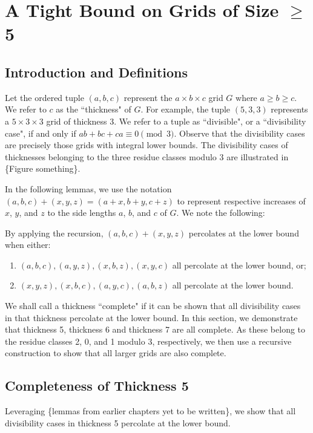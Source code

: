 \chapter{A Tight Bound on Grids of Size $\geq$ 5}

\section{Introduction and Definitions}
Let the ordered tuple $(a,b,c)$ represent the $a \times b \times c$ grid $G$ where $a \geq b \geq c$. We refer to $c$ as the ``thickness" of $G$. For example, the tuple $(5,3,3)$ represents a $5 \times 3 \times 3$ grid of thickness 3. We refer to a tuple as ``divisible", or a ``divisibility case", if and only if $ab+bc+ca \equiv 0 \pmod 3$. Observe that the divisibility cases are precisely those grids with integral lower bounds. The divisibility cases of thicknesses belonging to the three residue classes modulo 3 are illustrated in \{Figure something\}.

In the following lemmas, we use the notation $(a,b,c)+(x,y,z) = (a+x, b+y, c+z)$ to represent respective increases of $x$, $y$, and $z$ to the side lengths $a$, $b$, and $c$ of $G$. We note the following: 
\begin{rem}
\label{rem:recursion_pieces}
By applying the recursion, $(a,b,c)+(x,y,z)$ percolates at the lower bound when either:
\begin{enumerate}
\item $(a,b,c), (a,y,z), (x,b,z), (x,y,c)$ all percolate at the lower bound, or;
\item $(x,y,z), (x,b,c), (a,y,c), (a,b,z)$ all percolate at the lower bound.
\end{enumerate}
\end{rem}

We shall call a thickness ``complete" if it can be shown that all divisibility cases in that thickness percolate at the lower bound. In this section, we demonstrate that thickness 5, thickness 6 and thickness 7 are all complete. As these belong to the residue classes 2, 0, and 1 modulo 3, respectively, we then use a recursive construction to show that all larger grids are also complete. 

\section{Completeness of Thickness 5}
Leveraging \{lemmas from earlier chapters yet to be written\}, we show that all divisibility cases in thickness 5 percolate at the lower bound. 

